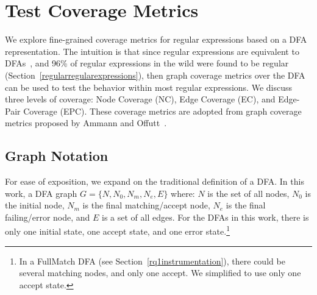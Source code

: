 \section{Test Coverage Metrics}
\label{sec:coverage}
We explore fine-grained coverage metrics for regular expressions based on a DFA representation. 
The intuition is that since regular expressions are equivalent to DFAs~\cite{sipser2006introduction}, and 96\% of regular expressions in the wild were found to be regular (Section~\ref{regularregularexpressions}), then graph coverage metrics over the DFA can be used to test the behavior within most regular expressions.  
We discuss three levels of coverage: Node Coverage (NC), Edge Coverage (EC), and Edge-Pair Coverage (EPC). These coverage metrics are adopted from graph coverage metrics proposed by Ammann and Offutt~\cite[Chapter 7]{ammann2016introduction}. 

\subsection{Graph Notation} 
For ease of exposition, we expand on the traditional definition of a DFA. In this work, a DFA graph $G = \{N, N_0, N_m, N_e, E\}$ where: $N$ is the set of all nodes, $N_0$ is the initial node, $N_m$ is the final matching/accept node, $N_e$ is the final failing/error node, and $E$ is a set of all edges. 
For the DFAs in this work, there is only one initial state, one accept state, and one error state.\footnote{In a FullMatch DFA (see Section~\ref{rq1instrumentation}), there could be several matching nodes, and only one accept. We simplified to use only one accept state.}

